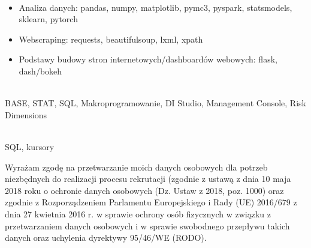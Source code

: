 \documentclass[10pt,a4paper,ragged2e,withhyper]{altacv}
\begin{document}
\begin{paracol}{1}
    \divider
    \\
    \begin{itemize}
        \item Analiza danych: pandas, numpy, matplotlib, pymc3, pyspark, statsmodels, sklearn, pytorch
        \item Webscraping: requests, beautifulsoup, lxml, xpath
        \item Podstawy budowy stron internetowych/dashboardów webowych: flask, dash/bokeh
    \end{itemize}
    \divider
    \\
    \quad BASE, STAT, SQL, Makroprogramowanie, DI Studio, Management Console, Risk Dimensions

    \divider
    \\
    \quad SQL, kursory

    \divider

    \divider



\end{paracol}
\center\vspace*{\fill}
\tiny
Wyrażam zgodę na przetwarzanie moich danych osobowych dla potrzeb niezbędnych do realizacji procesu rekrutacji (zgodnie z ustawą z dnia 10 maja 2018 roku o ochronie danych osobowych (Dz. Ustaw z 2018, poz. 1000) oraz zgodnie z Rozporządzeniem Parlamentu Europejskiego i Rady (UE) 2016/679 z dnia 27 kwietnia 2016 r. w sprawie ochrony osób fizycznych w związku z przetwarzaniem danych osobowych i w sprawie swobodnego przepływu takich danych oraz uchylenia dyrektywy 95/46/WE (RODO).
\end{document}
